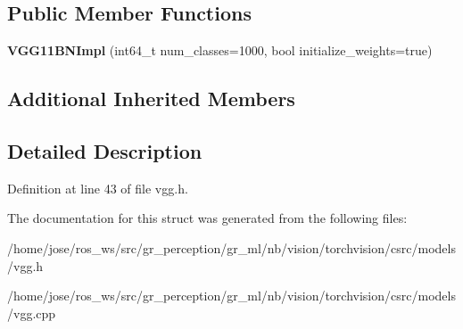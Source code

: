 \subsection*{Public Member Functions}
\begin{DoxyCompactItemize}
\item 
\mbox{\label{structvision_1_1models_1_1VGG11BNImpl_a641b802bfde8ccc8281be873fe87fb7b}} 
{\bfseries V\+G\+G11\+B\+N\+Impl} (int64\+\_\+t num\+\_\+classes=1000, bool initialize\+\_\+weights=true)
\end{DoxyCompactItemize}
\subsection*{Additional Inherited Members}


\subsection{Detailed Description}


Definition at line 43 of file vgg.\+h.



The documentation for this struct was generated from the following files\+:\begin{DoxyCompactItemize}
\item 
/home/jose/ros\+\_\+ws/src/gr\+\_\+perception/gr\+\_\+ml/nb/vision/torchvision/csrc/models/vgg.\+h\item 
/home/jose/ros\+\_\+ws/src/gr\+\_\+perception/gr\+\_\+ml/nb/vision/torchvision/csrc/models/vgg.\+cpp\end{DoxyCompactItemize}
